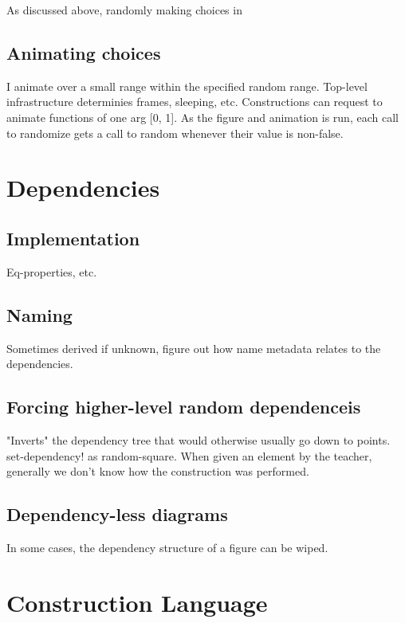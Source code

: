 As discussed above, randomly making choices in

\subsection{Animating choices}

I animate over a small range within the specified random
range. Top-level infrastructure determinies frames, sleeping, etc.
Constructions can request to animate functions of one arg [0, 1]. As
the figure and animation is run, each call to randomize gets a call to
random whenever their value is non-false.

\section{Dependencies}

\subsection{Implementation}

Eq-properties, etc.

\subsection{Naming}

Sometimes derived if unknown, figure out how name metadata relates to
the dependencies.

\subsection{Forcing higher-level random dependenceis}

"Inverts" the dependency tree that would otherwise usually go
down to points. set-dependency! as random-square. When given an
element by the teacher, generally we don't know how the construction
was performed.

\subsection{Dependency-less diagrams}

In some cases, the dependency structure of a figure can be wiped.

\section{Construction Language}

